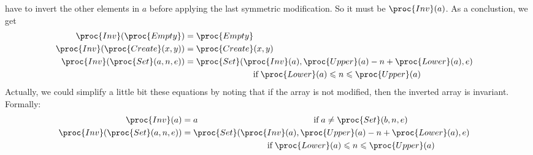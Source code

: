 \begin{itemize}
    have to invert the other elements in \(a\) before applying the
    last symmetric modification. So it must be \(\proc{Inv} (a)\). As
    a conclustion, we get
    \begin{align*}
       \proc{Inv} (\proc{Empty}) 
    &= \proc{Empty}\\
       \proc{Inv} (\proc{Create} (x, y))
    &= \proc{Create} (x, y)\\
       \proc{Inv} (\proc{Set} (a, n, e))
    &= \proc{Set} (\proc{Inv} (a), \proc{Upper} (a) - n + \proc{Lower}
       (a), e)\\
    & \qquad \qquad \qquad \qquad \text{if} \; \proc{Lower} (a)
      \leqslant n \leqslant \proc{Upper} (a) &
      \end{align*}
    Actually, we could simplify a little bit these equations by
    noting that if the array is not modified, then the inverted array
    is invariant. Formally:
    \begin{align*}
       \proc{Inv} (a) 
    &= a \qquad\qquad\qquad\qquad\qquad\qquad\quad\;\;
         \text{if} \; a \neq \proc{Set} (b, n, e)\\
       \proc{Inv} (\proc{Set} (a, n, e))
    &= \proc{Set} (\proc{Inv} (a), \proc{Upper} (a) - n + \proc{Lower}
       (a), e)\\
    & \qquad \qquad \qquad \qquad\qquad \text{if} \; \proc{Lower} (a)
      \leqslant n \leqslant \proc{Upper} (a) &
    \end{align*}


\end{itemize}
